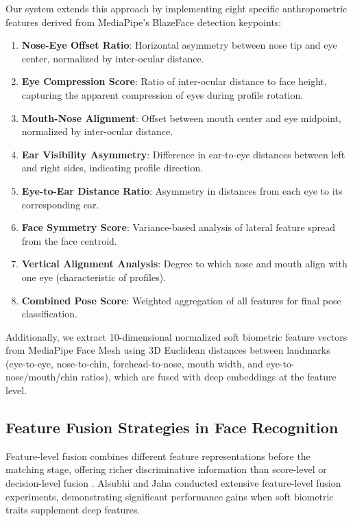 \documentclass[conference]{IEEEtran}
\begin{document}
Our system extends this approach by implementing eight specific anthropometric features derived from MediaPipe's BlazeFace detection keypoints:

\begin{enumerate}
\item \textbf{Nose-Eye Offset Ratio}: Horizontal asymmetry between nose tip and eye center, normalized by inter-ocular distance.
\item \textbf{Eye Compression Score}: Ratio of inter-ocular distance to face height, capturing the apparent compression of eyes during profile rotation.
\item \textbf{Mouth-Nose Alignment}: Offset between mouth center and eye midpoint, normalized by inter-ocular distance.
\item \textbf{Ear Visibility Asymmetry}: Difference in ear-to-eye distances between left and right sides, indicating profile direction.
\item \textbf{Eye-to-Ear Distance Ratio}: Asymmetry in distances from each eye to its corresponding ear.
\item \textbf{Face Symmetry Score}: Variance-based analysis of lateral feature spread from the face centroid.
\item \textbf{Vertical Alignment Analysis}: Degree to which nose and mouth align with one eye (characteristic of profiles).
\item \textbf{Combined Pose Score}: Weighted aggregation of all features for final pose classification.
\end{enumerate}

Additionally, we extract 10-dimensional normalized soft biometric feature vectors from MediaPipe Face Mesh using 3D Euclidean distances between landmarks (eye-to-eye, nose-to-chin, forehead-to-nose, mouth width, and eye-to-nose/mouth/chin ratios), which are fused with deep embeddings at the feature level.

\subsection{Feature Fusion Strategies in Face Recognition}

Feature-level fusion combines different feature representations before the matching stage, offering richer discriminative information than score-level or decision-level fusion \cite{b21}. Alsubhi and Jaha \cite{b4} conducted extensive feature-level fusion experiments, demonstrating significant performance gains when soft biometric traits supplement deep features.
\end{document}
